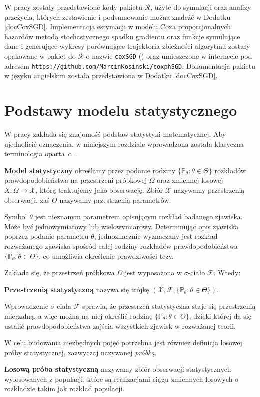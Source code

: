 W pracy zostały przedstawione kody pakietu $\mathcal{R}$, użyte do symulacji oraz analizy przeżycia, których zestawienie i podsumowanie można znaleźć w Dodatku \ref{docCoxSGD}. Implementacja estymacji w modelu Coxa proporcjonalnych hazardów metodą stochastycznego spadku gradientu oraz funkcje symulujące dane i generujące wykresy porównujące trajektoria zbieżności algorytmu zostały opakowane w pakiet do $\mathcal{R}$ o nazwie \texttt{coxSGD} (\cite{kosa0}) oraz umieszczone w internecie pod adresem \texttt{https://github.com/MarcinKosinski/coxphSGD}. Dokumentacja pakietu w języku angielskim została przedstawiona w Dodatku \ref{docCoxSGD}.

\chapter*{Podstawy modelu statystycznego}

W pracy zakłada się znajomość podstaw statystyki matematycznej. Aby ujednolicić oznaczenia, w niniejszym rozdziale wprowadzona została klasyczna terminologia oparta~o~\cite{niemiro}.

\begin{definition}
\textbf{Model statystyczny} określamy przez podanie rodziny $\{ \mathbb P_{\theta}:\theta\in\Theta\} $ rozkładów prawdopodobieństwa na przestrzeni próbkowej $\Omega$ oraz zmiennej losowej $X : \Omega \rightarrow \mathcal{X}$, którą traktujemy jako obserwację. Zbiór $\mathcal{X}$ nazywamy przestrzenią obserwacji, zaś $\Theta$ nazywamy przestrzenią parametrów. \\
\end{definition}
Symbol $\theta$ jest nieznanym parametrem opisującym rozkład badanego zjawiska. Może być jednowymiarowy lub wielowymiarowy. Determinując opis zjawiska poprzez podanie parametru $\theta$, jednoznacznie wyznaczany jest rozkład rozważanego zjawiska spośród całej rodziny rozkładów prawdopodobieństwa $\{ \mathbb P_{\theta}:\theta\in\Theta\}$, co umożliwia określenie prawdziwości tezy.
\par
Zakłada się, że przestrzeń próbkowa $\Omega$ jest wyposażona w $\sigma$-ciało $\mathcal{F}$. Wtedy:
\begin{definition}
\textbf{Przestrzenią statystyczną} nazywa się trójkę $(\mathcal{X},\mathcal{F},\{\mathbb P_{\theta}:\theta\in\Theta\})$.
\end{definition}
Wprowadzenie $\sigma$-ciała $\mathcal{F}$ sprawia, że przestrzeń statystyczna staje się przestrzenią mierzalną, a więc można na niej określić rodzinę $\{ \mathbb P_{\theta}:\theta\in\Theta\} $, dzięki której da się ustalić prawdopodobieństwa zajścia wszystkich zjawisk w rozważanej teorii.

W celu budowania niezbędnych pojęć potrzebna jest również definicja losowej próby statystycznej, zazwyczaj nazywanej \textit{próbką}.

\begin{definition}
 \textbf{Losową próba statystyczną} nazywamy zbiór obserwacji statystycznych wylosowanych z populacji, które są realizacjami ciągu zmiennych losowych o rozkładzie takim jak rozkład populacji.
 \end{definition}
